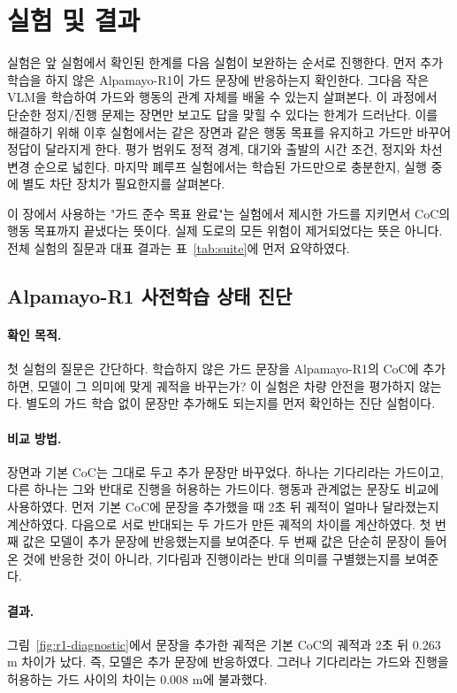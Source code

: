 \section{실험 및 결과}
\label{sec:experiments}

실험은 앞 실험에서 확인된 한계를 다음 실험이 보완하는 순서로 진행한다. 먼저 추가 학습을 하지 않은 Alpamayo-R1이 가드 문장에 반응하는지 확인한다. 그다음 작은 VLM을 학습하여 가드와 행동의 관계 자체를 배울 수 있는지 살펴본다. 이 과정에서 단순한 정지/진행 문제는 장면만 보고도 답을 맞힐 수 있다는 한계가 드러난다. 이를 해결하기 위해 이후 실험에서는 같은 장면과 같은 행동 목표를 유지하고 가드만 바꾸어 정답이 달라지게 한다. 평가 범위도 정적 경계, 대기와 출발의 시간 조건, 정지와 차선 변경 순으로 넓힌다. 마지막 폐루프 실험에서는 학습된 가드만으로 충분한지, 실행 중에 별도 차단 장치가 필요한지를 살펴본다.

이 장에서 사용하는 "가드 준수 목표 완료"는 실험에서 제시한 가드를 지키면서 CoC의 행동 목표까지 끝냈다는 뜻이다. 실제 도로의 모든 위험이 제거되었다는 뜻은 아니다. 전체 실험의 질문과 대표 결과는 표~\ref{tab:suite}에 먼저 요약하였다.

\subsection{Alpamayo-R1 사전학습 상태 진단}

\paragraph{확인 목적.}
첫 실험의 질문은 간단하다. 학습하지 않은 가드 문장을 Alpamayo-R1의 CoC에 추가하면, 모델이 그 의미에 맞게 궤적을 바꾸는가? 이 실험은 차량 안전을 평가하지 않는다. 별도의 가드 학습 없이 문장만 추가해도 되는지를 먼저 확인하는 진단 실험이다.

\paragraph{비교 방법.}
장면과 기본 CoC는 그대로 두고 추가 문장만 바꾸었다. 하나는 기다리라는 가드이고, 다른 하나는 그와 반대로 진행을 허용하는 가드이다. 행동과 관계없는 문장도 비교에 사용하였다. 먼저 기본 CoC에 문장을 추가했을 때 2초 뒤 궤적이 얼마나 달라졌는지 계산하였다. 다음으로 서로 반대되는 두 가드가 만든 궤적의 차이를 계산하였다. 첫 번째 값은 모델이 추가 문장에 반응했는지를 보여준다. 두 번째 값은 단순히 문장이 들어온 것에 반응한 것이 아니라, 기다림과 진행이라는 반대 의미를 구별했는지를 보여준다.

\paragraph{결과.}
그림~\ref{fig:r1-diagnostic}에서 문장을 추가한 궤적은 기본 CoC의 궤적과 2초 뒤 0.263 m 차이가 났다. 즉, 모델은 추가 문장에 반응하였다. 그러나 기다리라는 가드와 진행을 허용하는 가드 사이의 차이는 0.008 m에 불과했다.

